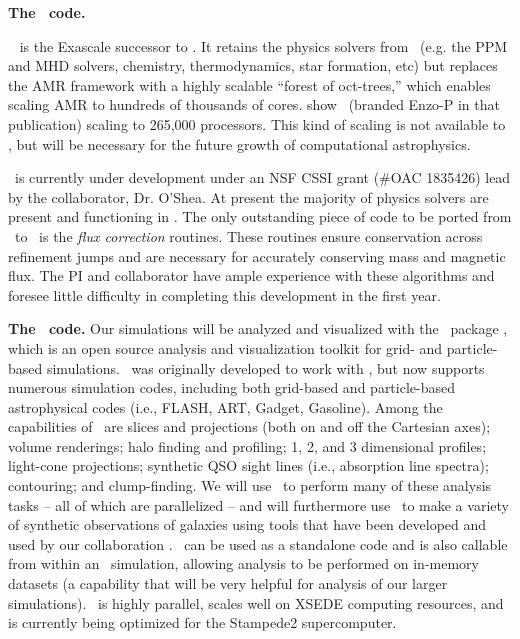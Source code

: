 {\large \textbf{The \enzoe\ code.}}


\enzoe\ \citep{Bordner12, Bordner18} is the Exascale successor to \enzo. 
It retains the physics solvers from \enzo\ (e.g. the PPM and MHD solvers,
chemistry, thermodynamics, star formation, etc) but replaces the AMR framework
with a highly scalable ``forest of oct-trees,'' which enables scaling AMR to
hundreds of thousands of cores. \citet{Bordner18} show \enzoe\ (branded Enzo-P
in that publication) scaling to 265,000 processors.  This kind of scaling is not
available to \enzo, but will be necessary for the future growth of computational
astrophysics.

\enzoe\ is currently under development under an NSF CSSI grant (\#OAC 1835426)  lead by the
collaborator, Dr. O'Shea.  At present the majority of physics solvers are
present and functioning in \enzoe.  The only outstanding piece of code
to be ported from \enzo\ to \enzoe\ is the \emph{flux correction} routines.
These routines ensure conservation across refinement jumps and are necessary for
accurately conserving mass and magnetic flux.  The PI and collaborator have ample experience with
these algorithms and foresee little difficulty in completing this development in
the first year.

\vspace{2mm}
\noindent
{\large \textbf{The \yt\ code.}}
Our simulations will be analyzed and visualized with the \yt\ package
\cite[][\url{http://yt-project.org}]{Turk11}, which is an open source
analysis and visualization toolkit for grid- and particle-based
simulations.  \yt\ was originally developed to work with \enzo, but
now supports numerous simulation codes, including both grid-based and
particle-based astrophysical codes (i.e., FLASH, ART, Gadget,
Gasoline).  Among the capabilities of \yt\ are slices and projections
(both on and off the Cartesian axes); volume renderings; halo finding
and profiling; 1, 2, and 3 dimensional profiles; light-cone
projections; synthetic QSO sight lines (i.e., absorption line spectra);
contouring; and clump-finding.  We will use \yt\ to perform many of
these analysis tasks -- all of which are parallelized -- and will
furthermore use \yt\ to make a variety of synthetic observations of
galaxies using tools that have been developed and used by our
collaboration \citep[e.g.,][]{Barrow17,Barrow17_FL2}.  \yt\ can be 
used as a standalone code and is also
callable from within an \enzo\ simulation, allowing analysis to be
performed on in-memory datasets (a capability that will be very
helpful for analysis of our larger simulations).  \yt\ is highly
parallel, scales well on XSEDE computing resources, and is currently
being optimized for the Stampede2 supercomputer.

